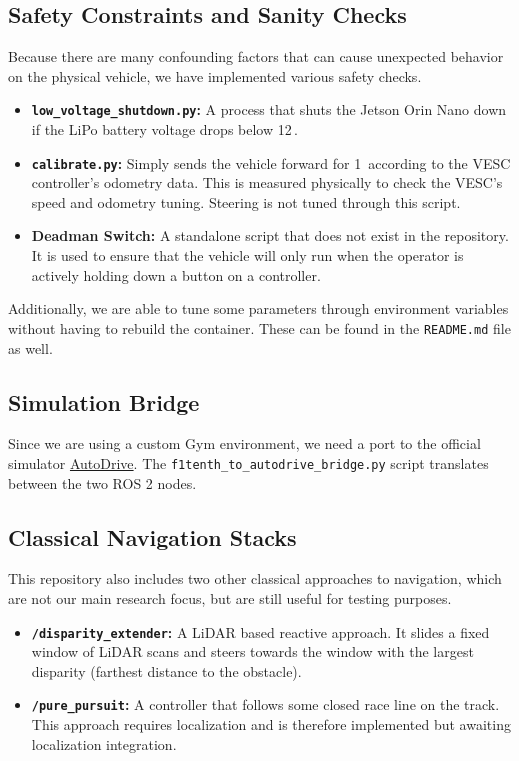 \documentclass[11pt,letterpaper]{article}
\begin{document}
\subsection{Safety Constraints and Sanity Checks}
Because there are many confounding factors that can cause unexpected behavior on the physical vehicle, we have implemented various safety checks.
\begin{itemize}
    \item \textbf{\texttt{low\_voltage\_shutdown.py}:} A process that shuts the Jetson Orin Nano down if the LiPo battery voltage drops below 12\,.
    \item \textbf{\texttt{calibrate.py}:} Simply sends the vehicle forward for 1\, according to the VESC controller's odometry data. This is measured physically to check the VESC's speed and odometry tuning. Steering is not tuned through this script.
    \item \textbf{Deadman Switch:} A standalone script that does not exist in the repository. It is used to ensure that the vehicle will only run when the operator is actively holding down a button on a controller.
\end{itemize}

Additionally, we are able to tune some parameters through environment variables without having to rebuild the container. These can be found in the \texttt{README.md} file as well.

\subsection{Simulation Bridge}
Since we are using a custom Gym environment, we need a port to the official simulator \href{https://autodrive-ecosystem.github.io/}{AutoDrive}. The \texttt{f1tenth\_to\_autodrive\_bridge.py} script translates between the two
ROS 2 nodes.

\subsection{Classical Navigation Stacks}
This repository also includes two other classical approaches to navigation, which are not our main research focus, but are still useful for testing purposes.
\begin{itemize}
    \item \textbf{\texttt{/disparity\_extender}:} A LiDAR based reactive approach. It slides a fixed window of LiDAR scans and steers towards the window with the largest disparity (farthest distance to the obstacle).
    \item \textbf{\texttt{/pure\_pursuit}:} A controller that follows some closed race line on the track. This approach requires localization and is therefore implemented but awaiting localization integration.
\end{itemize}
\end{document}
